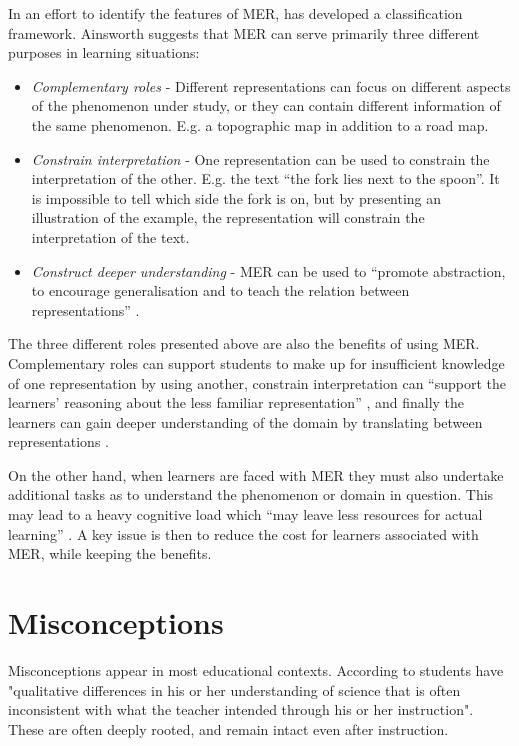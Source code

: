 In an effort to identify the features of MER, \citet{ainsworth1999functions} has developed a classification framework. Ainsworth suggests that MER can serve primarily three different purposes in learning situations:
\begin{itemize}
\item{} \emph{Complementary roles} - Different representations can focus on different aspects of the phenomenon under study, or they can contain different information of the same phenomenon. E.g. a topographic map in addition to a road map. 
\item{} \emph{Constrain interpretation} - One representation can be used to constrain the interpretation of the other. E.g. the text “the fork lies next to the spoon”. It is impossible to tell which side the fork is on, but by presenting an illustration of the example, the representation will constrain the interpretation of the text. 
\item{} \emph{Construct deeper understanding} - MER can be used to “promote abstraction, to encourage generalisation and to teach the relation between representations” \citep{ainsworth1999functions}. 
\end{itemize}

The three different roles presented above are also the benefits of using MER. Complementary roles can support students to make up for insufficient knowledge of one representation by using another, constrain interpretation can “support the learners’ reasoning about the less familiar representation” \citet{ainsworth1999functions}, and finally the learners can gain deeper understanding of the domain by translating between representations \citep{van2006supporting}. 

On the other hand, when learners are faced with MER they must also undertake additional tasks as to understand the phenomenon or domain in question. This may lead to a heavy cognitive load which “may leave less resources for actual learning” \citetext{Sweller, 1988, 1989, referenced in \citealp{van2006supporting}}. A key issue is then to reduce the cost for learners associated with MER, while keeping the benefits. 

\section{Misconceptions}
Misconceptions appear in most educational contexts. According to \citet{gomez2008elementary} students have "qualitative differences in his or her understanding of science that is often inconsistent with what the teacher intended through his or her instruction". These are often deeply rooted, and remain intact even after instruction. 

